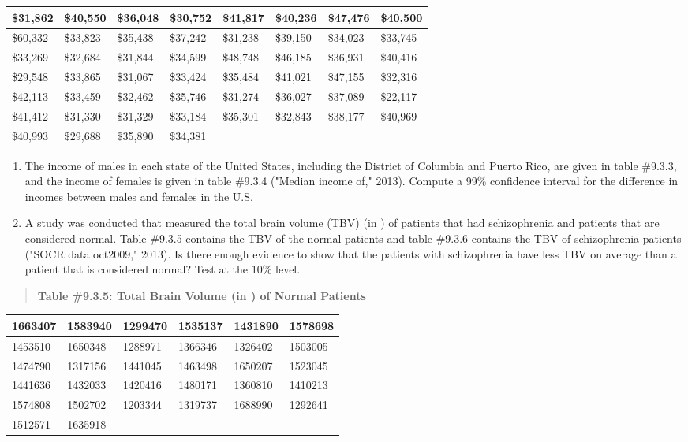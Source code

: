 \documentclass[]{book}
\begin{document}
\begin{longtable}[]{@{}llllllll@{}}
\toprule
\$31,862 & \$40,550 & \$36,048 & \$30,752 & \$41,817 & \$40,236 & \$47,476 & \$40,500\tabularnewline
\midrule
\endhead
\$60,332 & \$33,823 & \$35,438 & \$37,242 & \$31,238 & \$39,150 & \$34,023 & \$33,745\tabularnewline
\$33,269 & \$32,684 & \$31,844 & \$34,599 & \$48,748 & \$46,185 & \$36,931 & \$40,416\tabularnewline
\$29,548 & \$33,865 & \$31,067 & \$33,424 & \$35,484 & \$41,021 & \$47,155 & \$32,316\tabularnewline
\$42,113 & \$33,459 & \$32,462 & \$35,746 & \$31,274 & \$36,027 & \$37,089 & \$22,117\tabularnewline
\$41,412 & \$31,330 & \$31,329 & \$33,184 & \$35,301 & \$32,843 & \$38,177 & \$40,969\tabularnewline
\$40,993 & \$29,688 & \$35,890 & \$34,381 & & & &\tabularnewline
\bottomrule
\end{longtable}

\begin{enumerate}
\def\labelenumi{\arabic{enumi}.}
\setcounter{enumi}{1}
\item
  The income of males in each state of the United States, including the District of Columbia and Puerto Rico, are given in table \#9.3.3, and the income of females is given in table \#9.3.4 ("Median income of," 2013). Compute a 99\% confidence interval for the difference in incomes between males and females in the U.S.
\item
  A study was conducted that measured the total brain volume (TBV) (in ) of patients that had schizophrenia and patients that are considered normal. Table \#9.3.5 contains the TBV of the normal patients and table \#9.3.6 contains the TBV of schizophrenia patients ("SOCR data oct2009," 2013). Is there enough evidence to show that the patients with schizophrenia have less TBV on average than a patient that is considered normal? Test at the 10\% level.
\end{enumerate}

\begin{quote}
\textbf{Table \#9.3.5: Total Brain Volume (in ) of Normal Patients}
\end{quote}

\begin{longtable}[]{@{}llllll@{}}
\toprule
1663407 & 1583940 & 1299470 & 1535137 & 1431890 & 1578698\tabularnewline
\midrule
\endhead
1453510 & 1650348 & 1288971 & 1366346 & 1326402 & 1503005\tabularnewline
1474790 & 1317156 & 1441045 & 1463498 & 1650207 & 1523045\tabularnewline
1441636 & 1432033 & 1420416 & 1480171 & 1360810 & 1410213\tabularnewline
1574808 & 1502702 & 1203344 & 1319737 & 1688990 & 1292641\tabularnewline
1512571 & 1635918 & & & &\tabularnewline
\bottomrule
\end{longtable}
\end{document}
